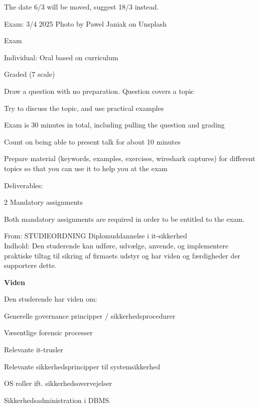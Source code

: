 \documentclass[Screen16to9,17pt]{foils}
\begin{document}
The date 6/3 will be moved, suggest 18/3 instead.

Exam: 3/4 2025 \hskip 12cm Photo by Pawel Janiak on Unsplash


\begin{list2}
\item Exam
\item Individual: Oral based on curriculum
\item Graded (7 scale)
\item Draw a question with no preparation. Question covers a topic
\item Try to discuss the topic, and use practical examples
\item Exam is 30 minutes in total, including pulling the question and grading
\item Count on being able to present talk for about 10 minutes
\item Prepare material (keywords, examples, exercises, wireshark captures) for different topics so that you can use it to help you at the exam

\vskip 5mm
\item Deliverables:
\item 2 Mandatory assignments
\item Both mandatory assignments are required in order to be entitled to the exam.
\end{list2}



From: STUDIEORDNING Diplomuddannelse i it-sikkerhed\\
Indhold: Den studerende kan udføre, udvælge, anvende, og implementere praktiske
tiltag til sikring af firmaets udstyr og har viden og færdigheder der supportere dette.

{\bf Viden}

Den studerende har viden om:
\begin{list2}
\item Generelle governance principper / sikkerhedsprocedurer
\item Væsentlige forensic processer
\item Relevante it-trusler
\item Relevante sikkerhedsprincipper til systemsikkerhed
\item OS roller ift. sikkerhedsovervejelser
\item Sikkerhedsadministration i DBMS.
\end{list2}
\end{document}
